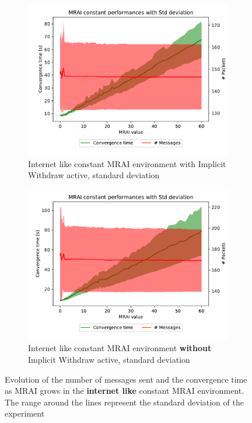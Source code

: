 \documentclass[10pt,conference,letterpaper]{IEEEtran}
\newcommand{\figwidth}{0.78}
\newcommand{\figvspace}{-1.5em}
\begin{document}
\begin{figure}[tb]
	\centering

	\begin{subfigure}{\columnwidth}
		\centering
		\includegraphics[width=\figwidth\columnwidth]{images/internet_like/graph-100-constant/mrai_evolution_std_alpha}
		\caption{Internet like constant \ac{MRAI} environment with Implicit Withdraw active, standard deviation}
		\label{fig:constant_IW_mrai_evolution_std_a}
		\qquad
	\end{subfigure}

	\begin{subfigure}{\columnwidth}
		\centering
		\includegraphics[width=\figwidth\columnwidth]{images/internet_like/graph-100-constant-noIW/mrai_evolution_std_alpha}
		\caption{Internet like constant \ac{MRAI} environment \textbf{without} Implicit Withdraw active, standard deviation}
		\label{fig:constant_noIW_mrai_evolution_std}
		\qquad
	\end{subfigure}

	\caption{Evolution of the number of messages sent and the convergence time as \ac{MRAI} grows
		in the \textbf{internet like} constant \ac{MRAI} environment. The range around the lines
		represent the standard deviation of the experiment}
	\label{fig:constant_mrai_evolution_std}
	\vspace{\figvspace}
\end{figure}
\end{document}
